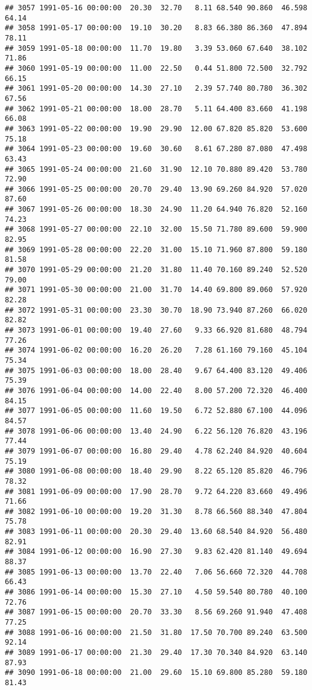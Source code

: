 \documentclass{article}\usepackage{graphicx, color}
\makeatletter
\newenvironment{kframe}{%
 \def\at@end@of@kframe{}%
 \ifinner\ifhmode%
  \def\at@end@of@kframe{\end{minipage}}%
  \begin{minipage}{\columnwidth}%
 \fi\fi%
 \def\FrameCommand##1{\hskip\@totalleftmargin \hskip-\fboxsep
 \colorbox{shadecolor}{##1}\hskip-\fboxsep
     \hskip-\linewidth \hskip-\@totalleftmargin \hskip\columnwidth}%
 \MakeFramed {\advance\hsize-\width
   \@totalleftmargin\z@ \linewidth\hsize
   \@setminipage}}%
 {\par\unskip\endMakeFramed%
 \at@end@of@kframe}
\newenvironment{knitrout}{}{} %
\makeatother
\begin{document}
\begin{knitrout}
\begin{kframe}
\begin{verbatim}
## 3057 1991-05-16 00:00:00  20.30  32.70   8.11 68.540 90.860  46.598  64.14
## 3058 1991-05-17 00:00:00  19.10  30.20   8.83 66.380 86.360  47.894  78.11
## 3059 1991-05-18 00:00:00  11.70  19.80   3.39 53.060 67.640  38.102  71.86
## 3060 1991-05-19 00:00:00  11.00  22.50   0.44 51.800 72.500  32.792  66.15
## 3061 1991-05-20 00:00:00  14.30  27.10   2.39 57.740 80.780  36.302  67.56
## 3062 1991-05-21 00:00:00  18.00  28.70   5.11 64.400 83.660  41.198  66.08
## 3063 1991-05-22 00:00:00  19.90  29.90  12.00 67.820 85.820  53.600  75.18
## 3064 1991-05-23 00:00:00  19.60  30.60   8.61 67.280 87.080  47.498  63.43
## 3065 1991-05-24 00:00:00  21.60  31.90  12.10 70.880 89.420  53.780  72.90
## 3066 1991-05-25 00:00:00  20.70  29.40  13.90 69.260 84.920  57.020  87.60
## 3067 1991-05-26 00:00:00  18.30  24.90  11.20 64.940 76.820  52.160  74.23
## 3068 1991-05-27 00:00:00  22.10  32.00  15.50 71.780 89.600  59.900  82.95
## 3069 1991-05-28 00:00:00  22.20  31.00  15.10 71.960 87.800  59.180  81.58
## 3070 1991-05-29 00:00:00  21.20  31.80  11.40 70.160 89.240  52.520  79.00
## 3071 1991-05-30 00:00:00  21.00  31.70  14.40 69.800 89.060  57.920  82.28
## 3072 1991-05-31 00:00:00  23.30  30.70  18.90 73.940 87.260  66.020  82.82
## 3073 1991-06-01 00:00:00  19.40  27.60   9.33 66.920 81.680  48.794  77.26
## 3074 1991-06-02 00:00:00  16.20  26.20   7.28 61.160 79.160  45.104  75.34
## 3075 1991-06-03 00:00:00  18.00  28.40   9.67 64.400 83.120  49.406  75.39
## 3076 1991-06-04 00:00:00  14.00  22.40   8.00 57.200 72.320  46.400  84.15
## 3077 1991-06-05 00:00:00  11.60  19.50   6.72 52.880 67.100  44.096  84.57
## 3078 1991-06-06 00:00:00  13.40  24.90   6.22 56.120 76.820  43.196  77.44
## 3079 1991-06-07 00:00:00  16.80  29.40   4.78 62.240 84.920  40.604  75.19
## 3080 1991-06-08 00:00:00  18.40  29.90   8.22 65.120 85.820  46.796  78.32
## 3081 1991-06-09 00:00:00  17.90  28.70   9.72 64.220 83.660  49.496  71.66
## 3082 1991-06-10 00:00:00  19.20  31.30   8.78 66.560 88.340  47.804  75.78
## 3083 1991-06-11 00:00:00  20.30  29.40  13.60 68.540 84.920  56.480  82.91
## 3084 1991-06-12 00:00:00  16.90  27.30   9.83 62.420 81.140  49.694  88.37
## 3085 1991-06-13 00:00:00  13.70  22.40   7.06 56.660 72.320  44.708  66.43
## 3086 1991-06-14 00:00:00  15.30  27.10   4.50 59.540 80.780  40.100  72.76
## 3087 1991-06-15 00:00:00  20.70  33.30   8.56 69.260 91.940  47.408  77.25
## 3088 1991-06-16 00:00:00  21.50  31.80  17.50 70.700 89.240  63.500  92.14
## 3089 1991-06-17 00:00:00  21.30  29.40  17.30 70.340 84.920  63.140  87.93
## 3090 1991-06-18 00:00:00  21.00  29.60  15.10 69.800 85.280  59.180  81.43

\end{verbatim}
\end{kframe}
\end{knitrout}
\end{document}
